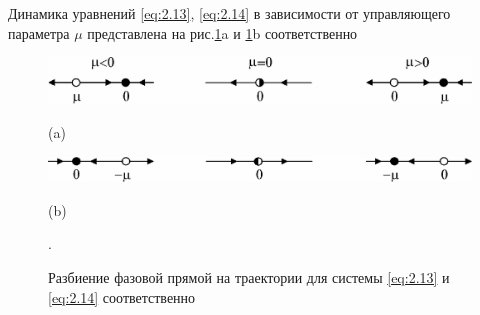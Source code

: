 Динамика уравнений \eqref{eq:2.13}, \eqref{eq:2.14} в зависимости от управляющего параметра $\mu$ представлена на рис.\ref{fig:2.7}a и \ref{fig:2.7}b соответственно

\begin{figure}[h!]
	\centering
	\begin{minipage}{\linewidth}
		\centering
		\includegraphics[]{fig/lect2/7a}

		(a)
		\label{fig:2_7a}
	\end{minipage}
	\vfill
    \vspace{1ex}
	\begin{minipage}{\linewidth}
		\centering
        \includegraphics[]{fig/lect2/7b}

		(b)
		\label{fig:2_7b}
	\end{minipage}
	\caption{Разбиение фазовой прямой на траектории для системы \eqref{eq:2.13} и \eqref{eq:2.14} соответственно}.
	\label{fig:2.7}
\end{figure}


